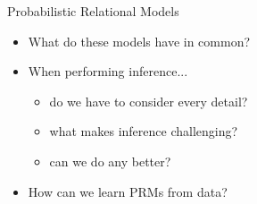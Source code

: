 \documentclass{beamer}
\begin{document}
\begin{frame}{Probabilistic Relational Models}
  \begin{itemize}
  \item What do these models have in common?
  \item When performing inference...
    \begin{itemize}
    \item do we have to consider every detail?
    \item what makes inference challenging?
    \item can we do any better?
    \end{itemize}
  \item How can we learn PRMs from data?
  \end{itemize}
\end{frame}
\end{document}
